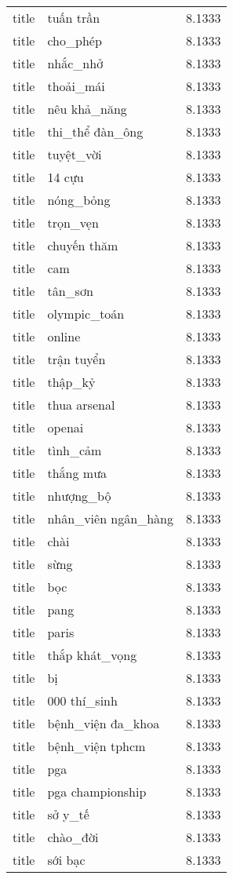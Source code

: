 \documentclass{article}
\begin{document}
\begin{tabular}{lll}
title & tuấn trần & 8.1333\\
title & cho\_phép & 8.1333\\
title & nhắc\_nhở & 8.1333\\
title & thoải\_mái & 8.1333\\
title & nêu khả\_năng & 8.1333\\
title & thi\_thể đàn\_ông & 8.1333\\
title & tuyệt\_vời & 8.1333\\
title & 14 cựu & 8.1333\\
title & nóng\_bỏng & 8.1333\\
title & trọn\_vẹn & 8.1333\\
title & chuyến thăm & 8.1333\\
title & cam & 8.1333\\
title & tân\_sơn & 8.1333\\
title & olympic\_toán & 8.1333\\
title & online & 8.1333\\
title & trận tuyển & 8.1333\\
title & thập\_kỷ & 8.1333\\
title & thua arsenal & 8.1333\\
title & openai & 8.1333\\
title & tình\_cảm & 8.1333\\
title & thắng mưa & 8.1333\\
title & nhượng\_bộ & 8.1333\\
title & nhân\_viên ngân\_hàng & 8.1333\\
title & chài & 8.1333\\
title & sừng & 8.1333\\
title & bọc & 8.1333\\
title & pang & 8.1333\\
title & paris & 8.1333\\
title & thắp khát\_vọng & 8.1333\\
title & bị & 8.1333\\
title & 000 thí\_sinh & 8.1333\\
title & bệnh\_viện đa\_khoa & 8.1333\\
title & bệnh\_viện tphcm & 8.1333\\
title & pga & 8.1333\\
title & pga championship & 8.1333\\
title & sở y\_tế & 8.1333\\
title & chào\_đời & 8.1333\\
title & sới bạc & 8.1333\\

\end{tabular}
\end{document}
